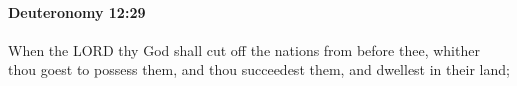 
		\paragraph{Deuteronomy 12:29} %
			\label{DEUTERONOMY-12-29}

			When the LORD thy God shall cut off the nations from before thee, whither thou goest to possess them, and thou succeedest them, and dwellest in their land;


